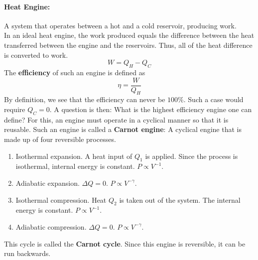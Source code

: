         \paragraph{Heat Engine: } A system that operates between a hot and a cold reservoir, producing work. \\
        In an ideal heat engine, the work produced equals the difference between the heat transferred between the engine and the reservoirs. Thus, all of the heat difference is converted to work.
        \begin{equation}
            W = Q_H - Q_C
        \end{equation}
        The \textbf{efficiency} of such an engine is defined as
        \begin{equation}
            \eta = \frac{W}{Q_H}
        \end{equation}
        By definition, we see that the efficiency can never be $100\%$. Such a case would require $Q_C=0$. A question is then: What is the highest efficiency engine one can define? For this, an engine must operate in a cyclical manner so that it is reusable. Such an engine is called a \textbf{Carnot engine}: A cyclical engine that is made up of four reversible processes. 
        \begin{enumerate}
            \item Isothermal expansion. A heat input of $Q_1$ is applied. Since the process is isothermal, internal energy is constant. $P\propto V^{-1}$.
            \item Adiabatic expansion. $\Delta Q=0$. $P\propto V^{-\gamma}$.
            \item Isothermal compression. Heat $Q_2$ is taken out of the system. The internal energy is constant. $P\propto V^{-1}$.
            \item Adiabatic compression. $\Delta Q = 0$. $P\propto V^{-\gamma}$. 
        \end{enumerate}
        This cycle is called the \textbf{Carnot cycle}. Since this engine is reversible, it can be run backwards. 

